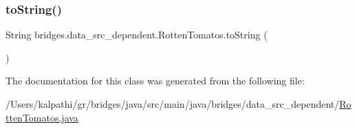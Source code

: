 \subsubsection{\texorpdfstring{toString()}{toString()}}
{\footnotesize\ttfamily String bridges.\+data\+\_\+src\+\_\+dependent.\+Rotten\+Tomatos.\+to\+String (\begin{DoxyParamCaption}{ }\end{DoxyParamCaption})}



The documentation for this class was generated from the following file\+:\begin{DoxyCompactItemize}
\item 
/\+Users/kalpathi/gr/bridges/java/src/main/java/bridges/data\+\_\+src\+\_\+dependent/\mbox{\hyperlink{_rotten_tomatos_8java}{Rotten\+Tomatos.\+java}}\end{DoxyCompactItemize}
